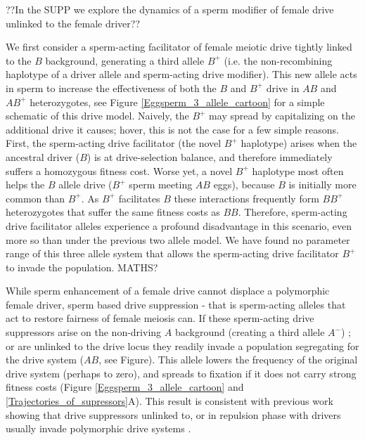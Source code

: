 \documentclass[12pt,letterpaper]{article}
\newcommand{\yb}[1]{{ \color{blue} #1}}
\begin{document}
\yb{??In the SUPP we explore the dynamics of a sperm modifier of female drive unlinked to the female driver??} 

We first consider a sperm-acting facilitator of
	female meiotic drive tightly linked to the $B$ background, 
	generating a third allele $B^{+}$ (i.e. the non-recombining haplotype of a
        driver allele and sperm-acting drive modifier). 
This new allele acts in sperm to increase the effectiveness of both
	the $B$ and  $B^{+}$ drive in $AB$ and $AB^{+}$ heterozygotes, see Figure \ref{Eggsperm_3_allele_cartoon} 
	for a simple schematic of this drive model.  
Naively, the $B^{+}$ may spread by capitalizing on the additional drive it causes; hover,  
	this is not the case for a few simple reasons. 
First, the sperm-acting drive facilitator (the novel $B^{+}$ haplotype) 
	arises when the ancestral driver ($B$) is at drive-selection balance, 
	and therefore immediately suffers a homozygous fitness cost.  
Worse yet, a novel $B^{+}$ haplotype most often helps 
	the $B$  allele drive ($B^+$ sperm meeting $AB$ eggs), because $B$ is initially more common than $B^{+}$. 
As $B^{+}$ facilitates $B$ these interactions frequently form 
	$BB^{+}$ heterozygotes that suffer the same fitness costs as $BB$. 
Therefore, sperm-acting drive facilitator alleles experience a profound disadvantage 
	in this scenario, even more so than under the previous two allele model. 
We have found no parameter range of this
	three allele system that allows the sperm-acting drive facilitator $B^{+}$ to
	invade the population. \yb{MATHS?}

While  sperm enhancement of a female drive cannot displace a polymorphic female driver, sperm based drive suppression - 
	that is sperm-acting alleles that act to restore  fairness of female meiosis can. 
If these sperm-acting drive suppressors arise on
	the non-driving $A$ background (creating a third allele $A^{-}$) ;
	or are unlinked to the drive locus they readily invade a population segregating
	for the drive system ($AB$, see Figure). 
This allele lowers the frequency of the original drive system (perhaps to zero),
	and spreads to fixation if it does not carry strong fitness costs
	(Figure \ref{Eggsperm_3_allele_cartoon} and \ref{Trajectories_of_supressors}A). 
\yb{This result is consistent with previous work showing that drive suppressors unlinked to, or in repulsion phase with drivers usually invade polymorphic drive systems \citep[e.g. ][]{Brandvain2012}.}  
\end{document}
